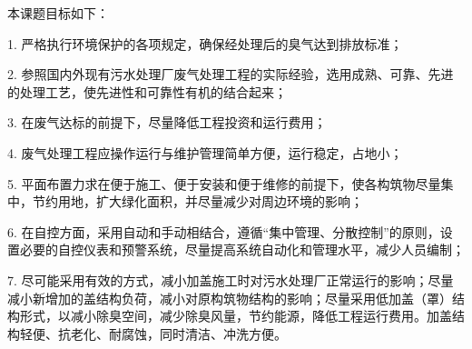 本课题目标如下：\par
1.	严格执行环境保护的各项规定，确保经处理后的臭气达到排放标准；\par
2.	参照国内外现有污水处理厂废气处理工程的实际经验，选用成熟、可靠、先进的处理工艺，使先进性和可靠性有机的结合起来；\par
3.	在废气达标的前提下，尽量降低工程投资和运行费用；\par
4.	废气处理工程应操作运行与维护管理简单方便，运行稳定，占地小；\par
5.	平面布置力求在便于施工、便于安装和便于维修的前提下，使各构筑物尽量集中，节约用地，扩大绿化面积，并尽量减少对周边环境的影响；\par
6.	在自控方面，采用自动和手动相结合，遵循“集中管理、分散控制”的原则，设置必要的自控仪表和预警系统，尽量提高系统自动化和管理水平，减少人员编制；\par
7.	尽可能采用有效的方式，减小加盖施工时对污水处理厂正常运行的影响；尽量减小新增加的盖结构负荷，减小对原构筑物结构的影响；尽量采用低加盖（罩）结构形式，以减小除臭空间，减少除臭风量，节约能源，降低工程运行费用。加盖结构轻便、抗老化、耐腐蚀，同时清洁、冲洗方便。\par
